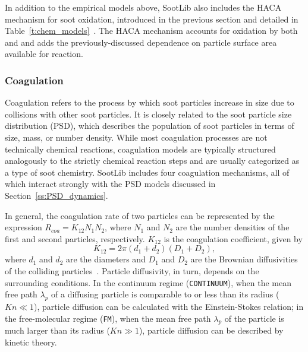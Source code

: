 \documentclass[preprint,letterpaper]{elsarticle}
\begin{document}
In addition to the empirical models above, SootLib also includes the HACA mechanism for soot oxidation, introduced in the previous section and detailed in Table~\ref{t:chem_models}~\cite{Appel_2000}. The HACA mechanism accounts for oxidation by both  and  and adds the previously-discussed dependence on particle surface area available for reaction.

\subsubsection{Coagulation}
\label{sss:coa}

Coagulation refers to the process by which soot particles increase in size due to collisions with other soot particles. It is closely related to the soot particle size distribution (PSD), which describes the population of soot particles in terms of size, mass, or number density. While most coagulation processes are not technically chemical reactions, coagulation models are typically structured analogously to the strictly chemical reaction steps and are usually categorized as a type of soot chemistry. SootLib includes four coagulation mechanisms, all of which interact strongly with the PSD models discussed in Section~\ref{ss:PSD_dynamics}.

In general, the coagulation rate of two particles can be represented by the expression $R_{coa}=K_{12}N_1N_2$, where $N_1$ and $N_2$ are the number densities of the first and second particles, respectively. $K_{12}$ is the coagulation coefficient, given by
\begin{equation} \label{e:soot-coag-K12}
K_{12}=2\pi (d_{1}+d_{2})(D_1+D_2),
\end{equation}
where $d_{1}$ and $d_{2}$ are the diameters and $D_1$ and $D_2$ are the Brownian diffusivities of the colliding particles~\cite{Seinfeld_2016}. Particle diffusivity, in turn, depends on the surrounding conditions. In the continuum regime (\texttt{CONTINUUM}), when the mean free path $\lambda_p$ of a diffusing particle is comparable to or less than its radius ($Kn\ll1$), particle diffusion can be calculated with the Einstein-Stokes relation; in the free-molecular regime (\texttt{FM}), when the mean free path $\lambda_p$ of the particle is much larger than its radius ($Kn\gg1$), particle diffusion can be described by kinetic theory.
\end{document}

